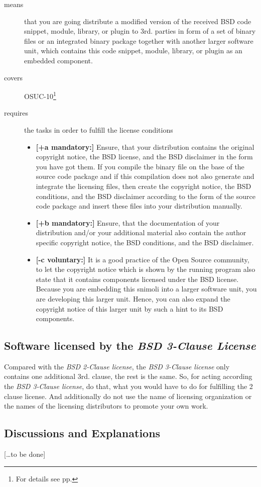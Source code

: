 \begin{description}
\item[means] that you are going distribute a modified version of the received
BSD code snippet, module, library, or plugin to 3rd. parties in form of a set of
binary files or an integrated binary package together with another larger
software unit, which contains this code snippet, module, library, or plugin as
an embedded component.
\item[covers] OSUC-10\footnote{For details see pp. \pageref{OSUC-10-DEF}}
\item[requires] the tasks in order to fulfill the license conditions
\begin{itemize}
  \item  \textbf{[+a mandatory:]} Ensure, that your distribution contains the
  original copyright notice, the BSD license, and the BSD disclaimer in the form
  you have got them. If you compile the binary file on the base of the source
  code package and if this compilation does not also generate and integrate the
  licensing files, then create the copyright notice, the BSD conditions, and the
  BSD disclaimer according to the form of the source code package and insert
  these files into your distribution manually.
  \item  \textbf{[+b mandatory:]} Ensure, that the documentation of your
  distribution and/or your additional material also contain the author specific
  copyright notice, the BSD conditions, and the BSD disclaimer.
 \item \textbf{[-c voluntary:]} It is a good practice of the Open Source
  community, to let the copyright notice which is shown by the running program
  also state that it contains components licensed under the BSD license. Because
  you are embedding this snimoli into a larger software unit, you are
  developing this larger unit. Hence, you can also expand the copyright notice
  of this larger unit by such a hint to its BSD components.
\end{itemize}
\end{description}

\subsection{Software licensed by the \emph{BSD 3-Clause License}}

Compared with the \textit{BSD 2-Clause license}, the \textit{BSD 3-Clause
license} only contains one additional 3rd. clause, the rest is the same. So, for
acting according the \textit{BSD 3-Clause license}, do that, what you would have
to do for fulfilling the 2 clause license. And additionally do not use the name
of licensing organization or the names of the licensing distributors to promote
your own work.

\subsection{Discussions and Explanations}
[\ldots to be done]

%
